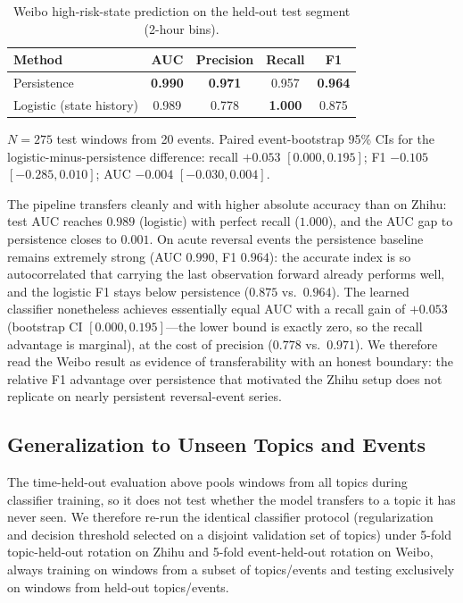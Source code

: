 \documentclass[journal]{IEEEtran}
\begin{document}
\begin{table}[H]
\caption{Weibo high-risk-state prediction on the held-out test segment (2-hour bins).}\label{tab:weibo_results}
\centering
\begin{threeparttable}
\begin{tabular}{lcccc}
\toprule
\textbf{Method} & \textbf{AUC} & \textbf{Precision} & \textbf{Recall} & \textbf{F1} \\
\midrule
Persistence & \textbf{0.990} & \textbf{0.971} & 0.957 & \textbf{0.964} \\
Logistic (state history) & 0.989 & 0.778 & \textbf{1.000} & 0.875 \\
\bottomrule
\end{tabular}
\begin{tablenotes}
\item $N=275$ test windows from 20 events. Paired event-bootstrap 95\% CIs for the logistic-minus-persistence difference: recall $+0.053$ $[0.000,0.195]$; F1 $-0.105$ $[-0.285,0.010]$; AUC $-0.004$ $[-0.030,0.004]$.
\end{tablenotes}
\end{threeparttable}
\end{table}

The pipeline transfers cleanly and with higher absolute accuracy than on Zhihu: test AUC reaches $0.989$ (logistic) with perfect recall ($1.000$), and the AUC gap to persistence closes to $0.001$. On acute reversal events the persistence baseline remains extremely strong (AUC $0.990$, F1 $0.964$): the accurate index is so autocorrelated that carrying the last observation forward already performs well, and the logistic F1 stays below persistence ($0.875$ vs.\ $0.964$). The learned classifier nonetheless achieves essentially equal AUC with a recall gain of $+0.053$ (bootstrap CI $[0.000,0.195]$---the lower bound is exactly zero, so the recall advantage is marginal), at the cost of precision ($0.778$ vs.\ $0.971$). We therefore read the Weibo result as evidence of transferability with an honest boundary: the relative F1 advantage over persistence that motivated the Zhihu setup does not replicate on nearly persistent reversal-event series.

\subsection{Generalization to Unseen Topics and Events}

The time-held-out evaluation above pools windows from all topics during classifier training, so it does not test whether the model transfers to a topic it has never seen. We therefore re-run the identical classifier protocol (regularization and decision threshold selected on a disjoint validation set of topics) under 5-fold topic-held-out rotation on Zhihu and 5-fold event-held-out rotation on Weibo, always training on windows from a subset of topics/events and testing exclusively on windows from held-out topics/events.
\end{document}
